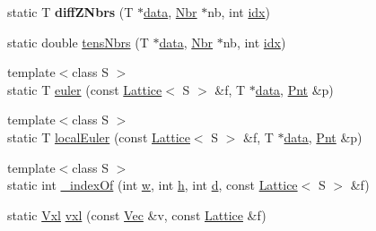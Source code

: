 \begin{DoxyCompactItemize}
\item 
\hypertarget{classvsr_1_1_lattice_ae12b4201484d6efe3c212424a8662d08}{static T {\bfseries diff\-Z\-Nbrs} (T $\ast$\hyperlink{classvsr_1_1_lattice_ac59d9a773db6eaca5875c270325ed407}{data}, \hyperlink{classvsr_1_1_nbr}{Nbr} $\ast$nb, int \hyperlink{classvsr_1_1_lattice_adb69198162bacf492faea0ceff8e497c}{idx})}\label{classvsr_1_1_lattice_ae12b4201484d6efe3c212424a8662d08}

\item 
static double \hyperlink{classvsr_1_1_lattice_a7d3da0e8c01c5b97a1b89603dfb48883}{tens\-Nbrs} (T $\ast$\hyperlink{classvsr_1_1_lattice_ac59d9a773db6eaca5875c270325ed407}{data}, \hyperlink{classvsr_1_1_nbr}{Nbr} $\ast$nb, int \hyperlink{classvsr_1_1_lattice_adb69198162bacf492faea0ceff8e497c}{idx})
\item 
{\footnotesize template$<$class S $>$ }\\static T \hyperlink{classvsr_1_1_lattice_a86b113596dac4e19eb78c0975340cae7}{euler} (const \hyperlink{classvsr_1_1_lattice}{Lattice}$<$ S $>$ \&f, T $\ast$\hyperlink{classvsr_1_1_lattice_ac59d9a773db6eaca5875c270325ed407}{data}, \hyperlink{namespacevsr_a2d05beb9721c5d9211b479af6d47222d}{Pnt} \&p)
\item 
{\footnotesize template$<$class S $>$ }\\static T \hyperlink{classvsr_1_1_lattice_a21027a9b207f10dfa399454cdf857bf3}{local\-Euler} (const \hyperlink{classvsr_1_1_lattice}{Lattice}$<$ S $>$ \&f, T $\ast$\hyperlink{classvsr_1_1_lattice_ac59d9a773db6eaca5875c270325ed407}{data}, \hyperlink{namespacevsr_a2d05beb9721c5d9211b479af6d47222d}{Pnt} \&p)
\item 
{\footnotesize template$<$class S $>$ }\\static int \hyperlink{classvsr_1_1_lattice_a89bcfc67612783002e054fc5bf453a7b}{\-\_\-index\-Of} (int \hyperlink{classvsr_1_1_lattice_ae377e62dbbed1f950bd900c34b30fb89}{w}, int \hyperlink{classvsr_1_1_lattice_a51b0756a11687bb9f69f886ed90ff68a}{h}, int \hyperlink{classvsr_1_1_lattice_a5ee2e0d41d22764521a812a82074886b}{d}, const \hyperlink{classvsr_1_1_lattice}{Lattice}$<$ S $>$ \&f)
\item 
\hypertarget{classvsr_1_1_lattice_a023471072d87db0672e59dbeab1da70f}{static \hyperlink{classvsr_1_1_vxl}{Vxl} \hyperlink{classvsr_1_1_lattice_a023471072d87db0672e59dbeab1da70f}{vxl} (const \hyperlink{namespacevsr_a0d061c30ac198a710a1b92dd8b343273}{Vec} \&v, const \hyperlink{classvsr_1_1_lattice}{Lattice} \&f)}\label{classvsr_1_1_lattice_a023471072d87db0672e59dbeab1da70f}


\end{DoxyCompactItemize}
